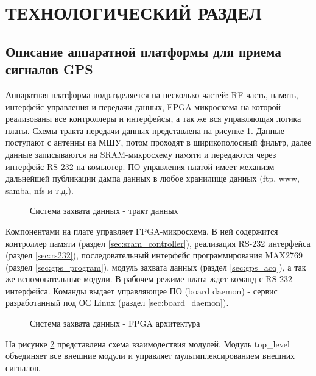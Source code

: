 \section{ТЕХНОЛОГИЧЕСКИЙ РАЗДЕЛ}

\subsection{Описание аппаратной платформы для приема сигналов GPS}
Аппаратная платформа подразделяется на несколько частей: RF-часть, память, интерфейс управления и передачи данных, FPGA-микросхема
на которой реализованы все контроллеры и интерфейсы, а так же вся управляющая логика платы. Схемы тракта передачи данных
представлена на рисунке \ref{pic:board_scheme}. Данные поступают с антенны на МШУ, потом проходят в ширикополосный фильтр, далее
данные записываются на SRAM-микросхему памяти и передаются через интерфейс RS-232 на комьютер. ПО управления платой имеет механизм
дальнейшей публикации дампа данных в любое хранилище данных (ftp, www, samba, nfs и т.д.). 

\begin{figure}[H]
\caption{Система захвата данных - тракт данных}
\label{pic:board_scheme}
\end{figure}

Компонентами на плате управляет FPGA-микросхема. В ней содержится контроллер памяти (раздел \ref{sec:sram_controller}), реализация RS-232
интерфейса (раздел \ref{sec:rs232}), последовательный интерфейс программирования MAX2769 (раздел \ref{sec:gps_program}), модуль захвата данных
(раздел \ref{sec:gps_acq}), а так же вспомогательные модули. В рабочем режиме плата ждет команд с RS-232 интерфейса. Команды выдает
управляющее ПО (board daemon) - сервис разработанный под ОС Linux (раздел \ref{sec:board_daemon}). 

\begin{figure}[H]
\begin{center}
\end{center}
\caption{Система захвата данных - FPGA архитектура}
\label{pic:fpga_scheme}
\end{figure}

На рисунке \ref{pic:fpga_scheme} представлена схема взаимодествия модулей. Модуль top\_level объединяет все внешние модули и 
управляет мультиплексированием внешних сигналов.

